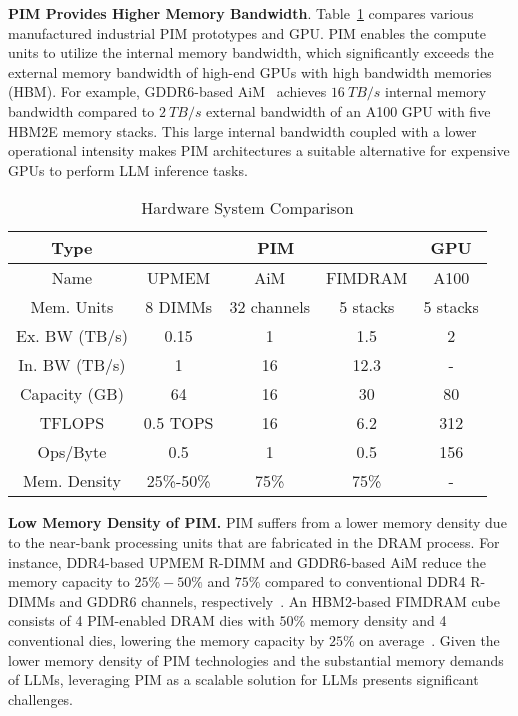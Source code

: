 \label{PIM-prototype}
\textbf{PIM Provides Higher Memory Bandwidth}. 
Table~\ref{tab:hardware_comparison} compares various manufactured industrial PIM prototypes and GPU. 
PIM enables the compute units to utilize the internal memory bandwidth, which significantly exceeds the external memory bandwidth of high-end GPUs with high bandwidth memories (HBM). For example, GDDR6-based AiM~\cite{aim1, aim2} achieves $16~TB/s$ internal memory bandwidth compared to $2~TB/s$ external bandwidth of an A100 GPU with five HBM2E memory stacks. This large internal bandwidth coupled with a lower operational intensity makes PIM architectures a suitable alternative for expensive GPUs to perform LLM inference tasks. 

\begin{table}[h]
    \footnotesize
    \centering
    \caption{Hardware System Comparison}
    \label{tab:hardware_comparison}    
    \begin{tabular}{|c|c|c|c|c|}
        \hline
        Type & \multicolumn{3}{|c|}{PIM} & GPU   \\
        \hline
        Name & UPMEM & AiM & FIMDRAM & A100 \\
        \hline
        \hline
        Mem. Units & 8 DIMMs & 32 channels & 5 stacks & 5 stacks \\
        \hline
        Ex. BW (TB/s) & 0.15 & 1 & 1.5 & 2 \\
        \hline
        In. BW (TB/s) & 1 & 16 & 12.3 & - \\
        \hline
        Capacity (GB) & 64 & 16 & 30 & 80 \\
        \hline
        TFLOPS & 0.5 TOPS\footnotemark & 16 & 6.2 & 312 \\
        \hline
        Ops/Byte & 0.5 & 1 & 0.5 & 156 \\
        \hline
        Mem. Density & 25\%-50\% & 75\% & 75\% & - \\
        \hline
    \end{tabular}
\end{table}


\textbf{Low Memory Density of PIM.}
PIM suffers from a lower memory density due to the near-bank processing units that are fabricated in the DRAM process.
For instance, DDR4-based UPMEM R-DIMM and GDDR6-based AiM reduce the memory capacity to $25\%{-}50\%$ and $75\%$ compared to conventional DDR4 R-DIMMs and GDDR6 channels, respectively~\cite{upmem, aim2}.
An HBM2-based FIMDRAM cube consists of 4 PIM-enabled DRAM dies with $50\%$ memory density and 4 conventional dies, lowering the memory capacity by $25\%$ on average~\cite{fimdram}.
Given the lower memory density of PIM technologies and the substantial memory demands of LLMs, leveraging PIM as a scalable solution for LLMs presents significant challenges.

